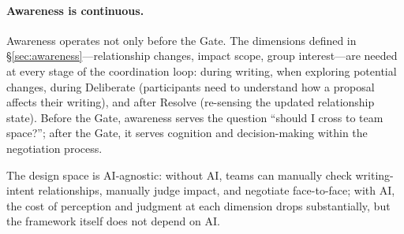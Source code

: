 \paragraph{Awareness is continuous.} Awareness operates not only before the Gate. The dimensions defined in \S\ref{sec:awareness}---relationship changes, impact scope, group interest---are needed at every stage of the coordination loop: during writing, when exploring potential changes, during Deliberate (participants need to understand how a proposal affects their writing), and after Resolve (re-sensing the updated relationship state). Before the Gate, awareness serves the question ``should I cross to team space?''; after the Gate, it serves cognition and decision-making within the negotiation process.

The design space is AI-agnostic: without AI, teams can manually check writing-intent relationships, manually judge impact, and negotiate face-to-face; with AI, the cost of perception and judgment at each dimension drops substantially, but the framework itself does not depend on AI.
